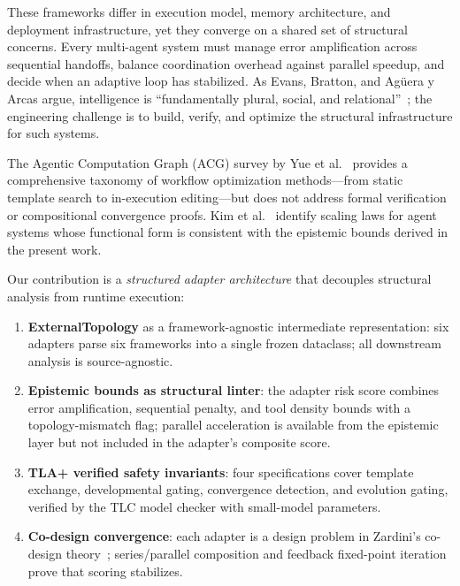 \documentclass[11pt]{article}
\begin{document}
These frameworks differ in execution model, memory architecture, and
deployment infrastructure, yet they converge on a shared set of structural
concerns.  Every multi-agent system must manage error amplification across
sequential handoffs, balance coordination overhead against parallel
speedup, and decide when an adaptive loop has stabilized.  As Evans,
Bratton, and Ag\"{u}era y Arcas argue, intelligence is ``fundamentally
plural, social, and relational''~\cite{evans2026plural}; the engineering
challenge is to build, verify, and optimize the structural infrastructure
for such systems.

The Agentic Computation Graph (ACG) survey by Yue et
al.~\cite{yue2026acg} provides a comprehensive taxonomy of workflow
optimization methods---from static template search to in-execution
editing---but does not address formal verification or compositional
convergence proofs.  Kim et al.~\cite{kim2025scaling} identify scaling
laws for agent systems whose functional form is consistent with the
epistemic bounds derived in the present work.

Our contribution is a \emph{structured adapter architecture} that decouples
structural analysis from runtime execution:

\begin{enumerate}[leftmargin=*,itemsep=2pt]
  \item \textbf{ExternalTopology} as a framework-agnostic intermediate
    representation: six adapters parse six frameworks into a single
    frozen dataclass; all downstream analysis is source-agnostic.
  \item \textbf{Epistemic bounds as structural linter}: the adapter
    risk score combines error amplification, sequential penalty, and tool
    density bounds with a topology-mismatch flag; parallel acceleration
    is available from the epistemic layer but not included in the
    adapter's composite score.
  \item \textbf{TLA+ verified safety invariants}: four specifications
    cover template exchange, developmental gating, convergence detection,
    and evolution gating, verified by the TLC model checker with
    small-model parameters.
  \item \textbf{Co-design convergence}: each adapter is a design problem
    in Zardini's co-design theory~\cite{zardini2023codesign};
    series/parallel composition and feedback fixed-point iteration prove
    that scoring stabilizes.
\end{enumerate}
\end{document}
